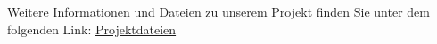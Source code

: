 Weitere Informationen und Dateien zu unserem Projekt finden Sie unter dem folgenden Link: \href{https://golfcar.space/Downloads/files/}{Projektdateien}
